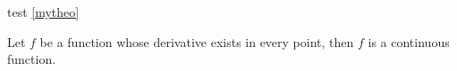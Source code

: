 \documentclass{beamer}
\begin{document}
\begin{frame} 
test \ref{mytheo}


\addtocounter{theorem}{-1}
\begin{theorem}
Let $f$ be a function whose derivative exists in every point, then $f$ 
is a continuous function.
\end{theorem}

\end{frame}
\end{document}
